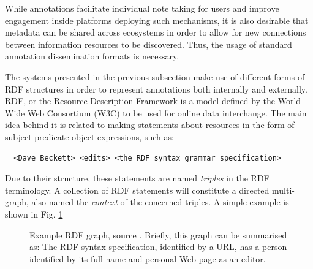 
While annotations facilitate individual note taking for users and improve
engagement inside platforms deploying such mechanisms, it is also desirable
that metadata can be shared across ecosystems in order to allow for new
connections between information resources to be discovered. Thus, the usage of
standard annotation dissemination formats is necessary.

The systems presented in the previous subsection make use of different forms of
RDF structures in order to represent annotations both internally and
externally.  RDF, or the Resource Description Framework \cite{ref:rdf} is a
model defined by the World Wide Web Consortium (W3C) to be used for online data
interchange. The main idea behind it is related to making statements about
resources in the form of subject-predicate-object expressions, such as:

\begin{verbatim}
  <Dave Beckett> <edits> <the RDF syntax grammar specification>
\end{verbatim}

Due to their structure, these statements are named \textit{triples} in the RDF
terminology.  A collection of RDF statements will constitute a directed
multi-graph, also named the \textit{context} of the concerned triples. A simple
example is shown in Fig. \ref{fig:rdf}

\begin{figure}[!ht]
  \centering
  \caption[Example RDF graph]
          {Example RDF graph, source \cite{ref:rdfsyntax}. Briefly, this graph
           can be summarised as: The RDF syntax specification, identified by a
           URL, has a person identified by its full name and personal Web page
           as an editor.}
  \label{fig:rdf}
\end{figure}

